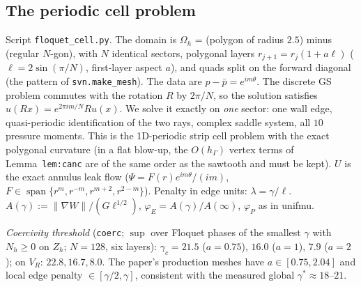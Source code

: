 \documentclass[11pt]{article}
\theoremstyle{remark}
\newcommand{\hG}{h_\Gamma}
\newcommand{\Oh}{\Omega_h}
\newcommand{\Zh}{Z_h}
\newcommand{\norm}[1]{\|#1\|}
\newcommand{\pbar}{\bar p}
\begin{document}
\subsection{The periodic cell problem}\label{sec:cell}
Script \texttt{floquet\_cell.py}. The domain is $\Oh$ = (polygon of radius $2.5$) minus (regular $N$-gon), with $N$ identical sectors, polygonal layers $r_{j+1}=r_j(1+a\ell)$ ($\ell=2\sin(\pi/N)$, first-layer aspect $a$), and quads split on the forward diagonal (the pattern of \texttt{svn.make\_mesh}). The data are $p-\pbar=e^{im\theta}$. The discrete GS problem commutes with the rotation $R$ by $2\pi/N$, so the solution satisfies $u(Rx)=e^{2\pi im/N}Ru(x)$. We solve it exactly on \emph{one} sector: one wall edge, quasi-periodic identification of the two rays, complex saddle system, all $10$ pressure moments. This is the 1D-periodic strip cell problem with the exact polygonal curvature (in a flat blow-up, the $O(\hG)$ vertex terms of Lemma~\texttt{lem:canc} are of the same order as the sawtooth and must be kept). $U$ is the exact annulus leak flow ($\Psi=F(r)e^{im\theta}/(im)$, $F\in\operatorname{span}\{r^m,r^{-m},r^{m+2},r^{2-m}\}$). Penalty in edge units: $\lambda=\gamma/\ell$. $A(\gamma):=\norm{\nabla W}/(G\ell^{1/2})$, $\varphi_E=A(\gamma)/A(\infty)$, $\varphi_P$ as in unifmu.

\emph{Coercivity threshold} (\texttt{coerc}; $\sup$ over Floquet phases of the smallest $\gamma$ with $N_h\ge0$ on $\Zh$; $N=128$, six layers): $\gamma_c=21.5$ ($a=0.75$), $16.0$ ($a=1$), $7.9$ ($a=2$); on $V_R$: $22.8,16.7,8.0$. The paper's production meshes have $a\in[0.75,2.04]$ and local edge penalty $\in[\gamma/2,\gamma]$, consistent with the measured global $\gamma^\ast\approx18$--$21$.
\end{document}
